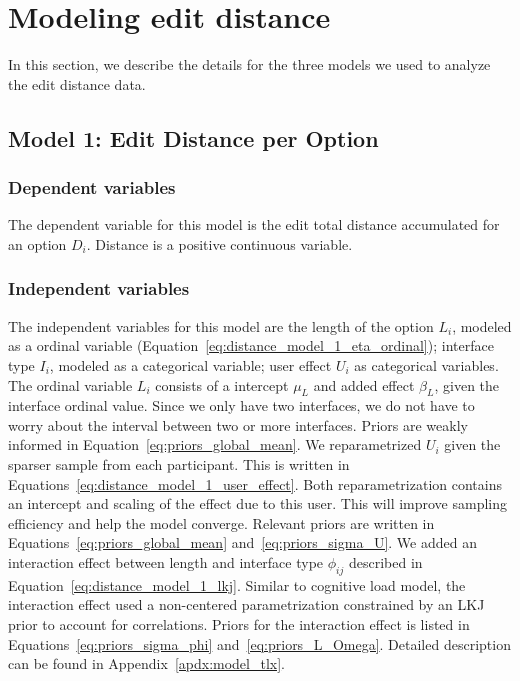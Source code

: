 \section{Modeling edit distance} \label{sec:apdx:model_distance}
In this section, we describe the details for the three models we used to analyze the edit distance data.

\subsection{Model 1: Edit Distance per Option} \label{sec:apdx:model_distance_option}

\subsubsection{Dependent variables}
The dependent variable for this model is the edit total distance accumulated for an option $D_i$. Distance is a positive continuous variable.

\subsubsection{Independent variables}
The independent variables for this model are the length of the option $L_i$, modeled as a ordinal variable (Equation~\ref{eq:distance_model_1_eta_ordinal}); interface type $I_i$, modeled as a categorical variable; user effect $U_i$ as categorical variables. The ordinal variable $L_i$ consists of a intercept $\mu_L$ and added effect $\beta_L$, given the interface ordinal value. Since we only have two interfaces, we do not have to worry about the interval between two or more interfaces. Priors are weakly informed in Equation~\ref{eq:priors_global_mean}. We reparametrized $U_i$ given the sparser sample from each participant. This is written in Equations~\ref{eq:distance_model_1_user_effect}. Both reparametrization contains an intercept and scaling of the effect due to this user. This will improve sampling efficiency and help the model converge. Relevant priors are written in Equations~\ref{eq:priors_global_mean} and~\ref{eq:priors_sigma_U}. We added an interaction effect between length and interface type $\phi_{ij}$ described in Equation~\ref{eq:distance_model_1_lkj}. Similar to cognitive load model, the interaction effect used a non-centered parametrization constrained by an LKJ prior to account for correlations. Priors for the interaction effect is listed in Equations~\ref{eq:priors_sigma_phi} and~\ref{eq:priors_L_Omega}. Detailed description can be found in Appendix~\ref{apdx:model_tlx}.

